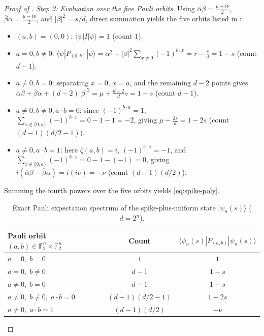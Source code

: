 \documentclass[11pt,a4paper]{article}
\theoremstyle{plain}
\theoremstyle{definition}
\theoremstyle{remark}
\newcommand{\F}{\mathbb{F}}
\newcommand{\ket}[1]{|#1\rangle}
\newcommand{\expval}[2]{\langle#1|#2|#1\rangle}
\newcommand{\abs}[1]{\lvert#1\rvert}
\numberwithin{equation}{section}
\begin{document}
\begin{proof}[Proof of ]
\emph{Step 3: Evaluation over the five Pauli orbits.}
Using $\overline{\alpha}\beta = \frac{\mu + i\nu}{2}$, $\overline{\beta}\alpha = \frac{\mu - i\nu}{2}$, and $\abs{\beta}^2 = s/d$, direct summation yields the five orbits listed in :
\begin{itemize}[leftmargin=1.8em]
  \item $(a, b) = (0, 0)$: $\expval{\psi}{I} = 1$ (count $1$).
  \item $a = 0, b \neq 0$: $\expval{\psi}{P_{(0,b)}} = \alpha^2 + \abs{\beta}^2 \sum_{x \neq 0}(-1)^{b \cdot x} = r - \frac{s}{d} = 1 - s$ (count $d - 1$).
  \item $a \neq 0, b = 0$: separating $x = 0$, $x = a$, and the remaining $d - 2$ points gives $\overline{\alpha}\beta + \overline{\beta}\alpha + (d-2)\abs{\beta}^2 = \mu + \frac{d-2}{d}s = 1 - s$ (count $d - 1$).
  \item $a \neq 0, b \neq 0, a \cdot b = 0$: since $(-1)^{b \cdot a} = 1$, $\sum_{x \notin \{0, a\}} (-1)^{b \cdot x} = 0 - 1 - 1 = -2$, giving $\mu - \frac{2s}{d} = 1 - 2s$ (count $(d-1)(d/2 - 1)$).
  \item $a \neq 0, a \cdot b = 1$: here $\zeta(a,b) = i$, $(-1)^{b \cdot a} = -1$, and $\sum_{x \notin \{0,a\}} (-1)^{b \cdot x} = 0 - 1 - (-1) = 0$, giving $i(\overline{\alpha}\beta - \overline{\beta}\alpha) = i(i\nu) = -\nu$ (count $(d-1)(d/2)$).
\end{itemize}
Summing the fourth powers over the five orbits yields \eqref{eq:spike-poly}.

\begin{table}[htbp]
\centering
\caption{Exact Pauli expectation spectrum of the spike-plus-uniform state $\ket{\psi_n(s)}$ ($d = 2^n$).}\label{tab:spike-orbits}
\smallskip
\renewcommand{\arraystretch}{1.15}
\begin{tabular}{@{}lcc@{}}
\toprule
Pauli orbit $(a, b) \in \F_2^n \times \F_2^n$ & Count & $\expval{\psi_n(s)}{P_{(a,b)}}$ \\
\midrule
$a = 0,\; b = 0$ & $1$ & $1$ \\
$a = 0,\; b \neq 0$ & $d - 1$ & $1 - s$ \\
$a \neq 0,\; b = 0$ & $d - 1$ & $1 - s$ \\
$a \neq 0,\; b \neq 0,\; a \cdot b = 0$ & $(d - 1)(d/2 - 1)$ & $1 - 2s$ \\
$a \neq 0,\; a \cdot b = 1$ & $(d - 1)(d/2)$ & $-\nu$ \\
\bottomrule
\end{tabular}
\end{table}


\end{proof}
\end{document}
